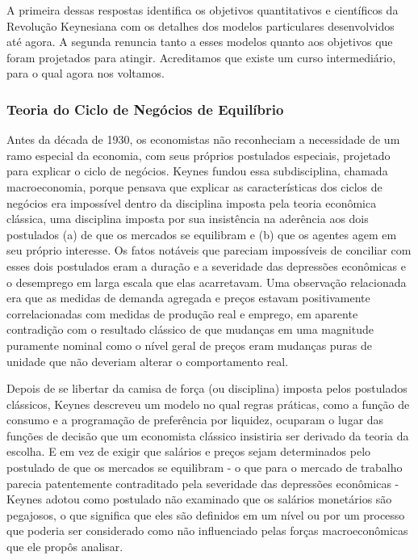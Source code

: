 \documentclass[12pt]{article}
\begin{document}
A primeira dessas respostas identifica os objetivos quantitativos e científicos da Revolução Keynesiana com os detalhes dos modelos particulares desenvolvidos até agora. A segunda renuncia tanto a esses modelos quanto aos objetivos que foram projetados para atingir. Acreditamos que existe um curso intermediário, para o qual agora nos voltamos.

\subsubsection{\textbf{Teoria do Ciclo de Negócios de Equilíbrio}}

Antes da década de 1930, os economistas não reconheciam a necessidade de um ramo especial da economia, com seus próprios postulados especiais, projetado para explicar o ciclo de negócios. Keynes fundou essa subdisciplina, chamada macroeconomia, porque pensava que explicar as características dos ciclos de negócios era impossível dentro da disciplina imposta pela teoria econômica clássica, uma disciplina imposta por sua insistência na aderência aos dois postulados (a) de que os mercados se equilibram e (b) que os agentes agem em seu próprio interesse. Os fatos notáveis que pareciam impossíveis de conciliar com esses dois postulados eram a duração e a severidade das depressões econômicas e o desemprego em larga escala que elas acarretavam. Uma observação relacionada era que as medidas de demanda agregada e preços estavam positivamente correlacionadas com medidas de produção real e emprego, em aparente contradição com o resultado clássico de que mudanças em uma magnitude puramente nominal como o nível geral de preços eram mudanças puras de unidade que não deveriam alterar o comportamento real.

Depois de se libertar da camisa de força (ou disciplina) imposta pelos postulados clássicos, Keynes descreveu um modelo no qual regras práticas, como a função de consumo e a programação de preferência por liquidez, ocuparam o lugar das funções de decisão que um economista clássico insistiria ser derivado da teoria da escolha. E em vez de exigir que salários e preços sejam determinados pelo postulado de que os mercados se equilibram - o que para o mercado de trabalho parecia patentemente contraditado pela severidade das depressões econômicas - Keynes adotou como postulado não examinado que os salários monetários são pegajosos, o que significa que eles são definidos em um nível ou por um processo que poderia ser considerado como não influenciado pelas forças macroeconômicas que ele propôs analisar.
\end{document}
